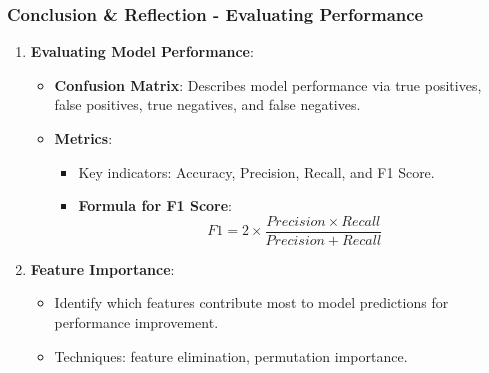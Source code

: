\documentclass[aspectratio=169]{beamer}
\begin{document}
\begin{frame}[fragile]
    \frametitle{Conclusion \& Reflection - Evaluating Performance}
    \begin{enumerate}[resume]
        \item \textbf{Evaluating Model Performance}:
        \begin{itemize}
            \item \textbf{Confusion Matrix}: Describes model performance via true positives, false positives, true negatives, and false negatives.
            \item \textbf{Metrics}: 
            \begin{itemize}
                \item Key indicators: Accuracy, Precision, Recall, and F1 Score.
                \item \textbf{Formula for F1 Score}:
                \begin{equation}
                F1 = 2 \times \frac{Precision \times Recall}{Precision + Recall}
                \end{equation}
            \end{itemize}
        \end{itemize}

        \item \textbf{Feature Importance}:
        \begin{itemize}
            \item Identify which features contribute most to model predictions for performance improvement.
            \item Techniques: feature elimination, permutation importance.
        \end{itemize}
    \end{enumerate}
\end{frame}
\end{document}
